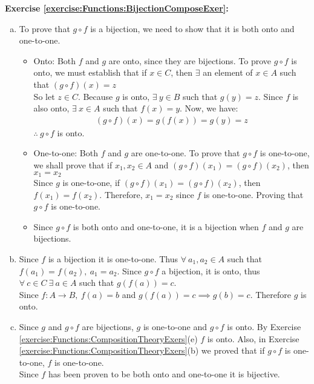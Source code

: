 \noindent\textbf{Exercise \ref{exercise:Functions:BijectionComposeExer}:} %
\begin{enumerate}[(a)]
\item \label{BijectionComposeExer-gf}
To prove that $g\circ f$ is a bijection, we need to show that it is both onto and one-to-one.
	\begin{itemize}        
	\item
	Onto: Both $f$ and $g$ are onto, since they are bijections. To prove $g\circ f$ is onto, we must establish that if $x\in C$, then $\exists$ an element of $x\in A$ such that $(g\circ f)(x) = z$\\
	So let $z\in C$. Because $g$ is onto, $\exists\ y\in B$ such that $g(y) = z$. Since $f$ is also onto, $\exists\ x\in A$ such that $f(x) = y$. Now, we have:
	\begin{align*}
	(g\circ f)(x) = g(f(x)) = g(y) = z
	\end{align*}
	$\therefore\ g\circ f$ is onto.
	 
	\item
	One-to-one: Both $f$ and $g$ are one-to-one. To prove that $g\circ f$ is one-to-one, we shall prove that if $x_{1},x_{2}\in A$ and $(g\circ f)(x_{1}) = (g\circ f)(x_{2})$, then $x_{1} = x_{2}$\\
	Since $g$ is one-to-one, if $(g\circ f)(x_{1}) = (g\circ f)(x_{2})$, then $f(x{_1}) = f(x_{2})$. Therefore, $x_{1} = x_{2}$ since $f$ is one-to-one. Proving that $g\circ f$ is one-to-one.
	
	\item
	Since $g\circ f$ is both onto and one-to-one, it is a bijection when $f$ and $g$ are bijections.  
	\end{itemize}
	  
\item  \label{BijectionComposeExer-g}
Since $f$ is a bijection it is one-to-one. Thus $\forall\ a_{1},a_{2}\in A$ such that $f(a_{1}) = f(a_{2}),\ a_{1} = a_{2}$. Since $g\circ f$ a bijection, it is onto, thus $\forall\ c\in C\ \exists\ a\in A$ such that $g(f(a)) = c$.\\
Since $f\colon A\to B,\ f(a) = b$ and $g(f(a)) = c \implies g(b) = c$. Therefore $g$ is onto.

\item \label{BijectionComposeExer-f}
Since $g$ and $g\circ f$ are bijections, $g$ is one-to-one and $g\circ f$ is onto. By Exercise \ref{exercise:Functions:CompositionTheoryExers}(e) $f$ is onto. Also, in Exercise \ref{exercise:Functions:CompositionTheoryExers}(b) we proved that if $g\circ f$ is one-to-one, $f$ is one-to-one.\\
Since $f$ has been proven to be both onto and one-to-one it is bijective.
\end{enumerate}

